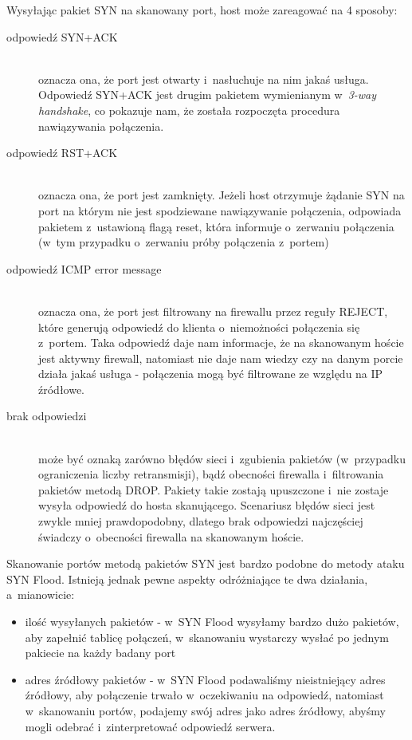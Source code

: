 \documentclass[a4paper,12pt]{book}
\begin{document}
			Wysyłając pakiet SYN na skanowany port, host może zareagować na 4 sposoby:
			\begin{description}
			\item[odpowiedź SYN+ACK]\hfill \\
			oznacza ona, że port jest otwarty i~nasłuchuje na nim jakaś usługa.
			Odpowiedź SYN+ACK jest drugim pakietem wymienianym w~\textit{3-way handshake}, co pokazuje nam, że została rozpoczęta procedura nawiązywania połączenia.
			\item[odpowiedź RST+ACK]\hfill \\
			oznacza ona, że port jest zamknięty.
			Jeżeli host otrzymuje żądanie SYN na port na którym nie jest spodziewane nawiązywanie połączenia, odpowiada pakietem z~ustawioną flagą reset, która informuje o~zerwaniu połączenia (w~tym przypadku o~zerwaniu próby połączenia z~portem)
			\item[odpowiedź ICMP error message]\hfill \\
			oznacza ona, że port jest filtrowany na firewallu przez reguły REJECT, które generują odpowiedź do klienta o~niemożności połączenia się z~portem.
			Taka odpowiedź daje nam informacje, że na skanowanym hoście jest aktywny firewall, natomiast nie daje nam wiedzy czy na danym porcie działa jakaś usługa - połączenia mogą być filtrowane ze względu na IP źródłowe.
			\item[brak odpowiedzi]\hfill \\
			może być oznaką zarówno błędów sieci i~zgubienia pakietów (w~przypadku ograniczenia liczby retransmisji), bądź obecności firewalla i~filtrowania pakietów metodą DROP.
			Pakiety takie zostają upuszczone i~nie zostaje wysyła odpowiedź do hosta skanującego.
			Scenariusz błędów sieci jest zwykle mniej prawdopodobny, dlatego brak odpowiedzi najczęściej świadczy o~obecności firewalla na skanowanym hoście.
			\end{description}
			
			Skanowanie portów metodą pakietów SYN jest bardzo podobne do metody ataku SYN Flood.
			Istnieją jednak pewne aspekty odróżniające te dwa działania, a~mianowicie:
			\begin{itemize}
			\item ilość wysyłanych pakietów - w~SYN Flood wysyłamy bardzo dużo pakietów, aby zapełnić tablicę połączeń, w~skanowaniu wystarczy wysłać po jednym pakiecie na każdy badany port
			\item adres źródłowy pakietów - w~SYN Flood podawaliśmy nieistniejący adres źródłowy, aby połączenie trwało w~oczekiwaniu na odpowiedź,
			natomiast w~skanowaniu portów, podajemy swój adres jako adres źródłowy, abyśmy mogli odebrać i~zinterpretować odpowiedź serwera.
			\end{itemize}
\end{document}
